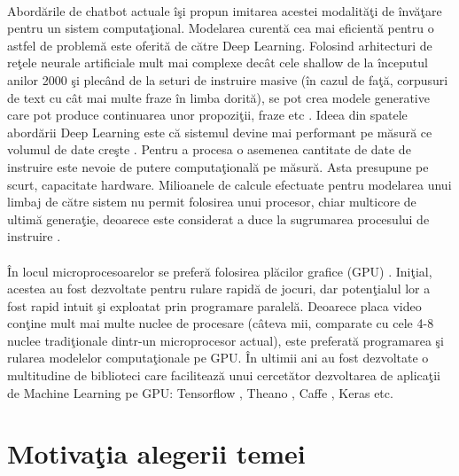 \paragraph{}
Abord\u arile de chatbot actuale \^ i\c si propun imitarea acestei modalit\u a\c ti de \^ inv\u a\c tare pentru un sistem computa\c tional. Modelarea curent\u a cea mai eficient\u a pentru o astfel de problem\u a este oferit\u a de c\u atre Deep Learning. Folosind arhitecturi de re\c tele neurale artificiale mult mai complexe dec\^ at cele shallow de la \^ inceputul anilor 2000 \c si plec\^ and de la seturi de instruire masive (\^ in cazul de fa\c t\u a, corpusuri de text cu c\^ at mai multe fraze \^ in limba dorit\u a), se pot crea modele generative care pot produce continuarea unor propozi\c tii, fraze etc \cite{wildml-chatbots}. Ideea din spatele abord\u arii Deep Learning este c\u a sistemul devine mai performant pe m\u asur\u a ce volumul de date cre\c ste \cite{deep-learning-mode-data}. Pentru a procesa o asemenea cantitate de date de instruire este nevoie de putere computa\c tional\u a pe m\u asur\u a. Asta presupune pe scurt, capacitate hardware. Milioanele de calcule efectuate pentru modelarea unui limbaj de c\u atre sistem nu permit folosirea unui procesor, chiar multicore de ultim\u a genera\c tie, deoarece este considerat a duce la sugrumarea procesului de instruire \cite{cpu-failure}.

\paragraph{}
\^ In locul microprocesoarelor se prefer\u a folosirea pl\u acilor grafice (GPU) \cite{cpu-vs-gpu}. Ini\c tial, acestea au fost dezvoltate pentru rulare rapid\u a de jocuri, dar poten\c tialul lor a fost rapid intuit \c si exploatat prin programare paralel\u a. Deoarece placa video con\c tine mult mai multe nuclee de procesare (c\^ ateva mii, comparate cu cele 4-8 nuclee tradi\c tionale dintr-un microprocesor actual), este preferat\u a programarea \c si rularea modelelor computa\c tionale pe GPU. \^ In ultimii ani au fost dezvoltate o multitudine de biblioteci care faciliteaz\u a unui cercet\u ator dezvoltarea de aplica\c tii de Machine Learning pe GPU: Tensorflow \cite{DBLP:journals/corr/AbadiABBCCCDDDG16}, Theano \cite{2016arXiv160502688short}, Caffe \cite{jia2014caffe}, Keras \cite{chollet2015keras} etc.

\section{Motiva\c tia alegerii temei}

